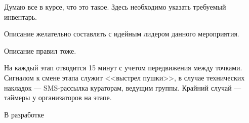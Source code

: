 \documentclass[a4paper, 12pt]{extarticle}
\begin{document}
\par Думаю все в курсе, что это такое. Здесь необходимо указать требуемый инвентарь.

\par Описание желательно составлять с идейным лидером данного мероприятия.

\par Описание правил тоже.









\par На каждый этап отводится 15 минут с учетом передвижения между точками. Сигналом к смене этапа служит <<выстрел пушки>>, в случае технических накладок --- SMS-рассылка кураторам, ведущим группы. Крайний случай --- таймеры у организаторов на этапе.
\par В разработке
\end{document}

